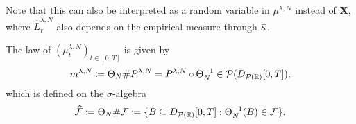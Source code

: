 \documentclass{article}
\begin{document}
Note that this can also be interpreted as a random variable in $\mu^{\lambda,N}$ instead of $\bm{X}$, where $\widehat{L}_r^{\lambda, N}$ also depends on the empirical measure through $\ol{\kappa}$.

\bigskip

The law of $(\mu_t^{\lambda, N})_{t\in[0,T]}$ is given by
\begin{equation}
    m^{\lambda,N} \coloneqq \Theta_N \# P^{\lambda, N} = P^{\lambda, N} \circ \Theta_N^{-1} \in \mathcal{P}(D_{\mathcal{P}(\mathbb{R})}[0,T]),
\end{equation}
which is defined on the $\sigma$-algebra
\begin{equation}
    \widehat{\mathcal{F}} \coloneqq \Theta_N \# \mathcal{F} \coloneqq \{B \subseteq D_{\mathcal{P}(\mathbb{R})}[0,T] : \Theta_N^{-1}(B) \in \mathcal{F}\}.
\end{equation}
\end{document}
